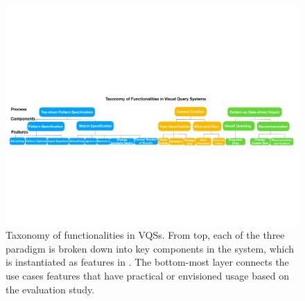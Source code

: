 \begin{figure}[ht!]
  \centering
  \includegraphics[width=\linewidth]{figures/full_taxonomy_wide.pdf}
  \caption{Taxonomy of functionalities in VQSs. From top, each of the three paradigm is broken down into key components in the system, which is instantiated as features in \zv. The bottom-most layer connects the use cases features that have practical or envisioned usage based on the evaluation study.}
  \label{fig:taxonomy}
\end{figure}
